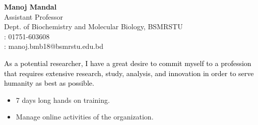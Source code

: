 \documentclass[10pt,a4paper,ragged2e,withhyper]{altacv}
\begin{document}
\begin{paracol}{2}
		\textbf{Manoj Mandal}\\
		Assistant Professor\\
		Dept. of Biochemistry and Molecular Biology, BSMRSTU\\
		\faPhone: 01751-603608\\
		\faLaptop: {\footnotesize manoj.bmb18@bsmrstu.edu.bd}
		
		
		
		
		
		\newpage
		
		\switchcolumn
		
		\begin{justify}
			\textcolor{black}{As a potential researcher, I have a great desire to commit myself to a profession that requires extensive research, study, analysis, and innovation in order to serve humanity as best as possible.}
		\end{justify}
		
		\medskip
		
		\begin{itemize}
			\item 7 days long hands on training.
			\item Manage online activities of the organization.
		\end{itemize}
		\divider
		

\end{paracol}
\end{document}
